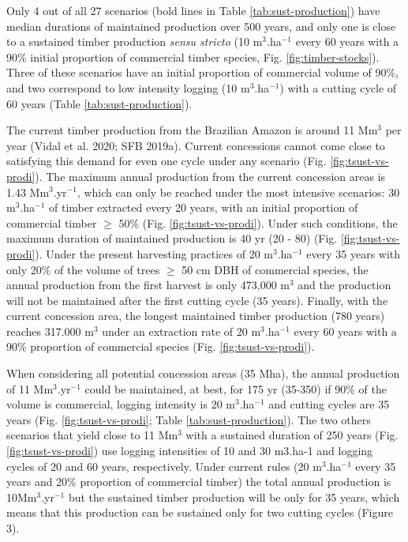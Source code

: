 \documentclass[
]{article}
\begin{document}
Only 4 out of all 27 scenarios (bold lines in Table \ref{tab:sust-production}) have median durations of maintained production over 500 years, and only one is close to a sustained timber production \emph{sensu stricto} (10 m\(^3\).ha\(^{-1}\) every 60 years with a 90\% initial proportion of commercial timber species, Fig. \ref{fig:timber-stocks}). Three of these scenarios have an initial proportion of commercial volume of 90\%, and two correspond to low intensity logging (10 m\(^3\).ha\(^{-1}\)) with a cutting cycle of 60 years (Table \ref{tab:sust-production}).

The current timber production from the Brazilian Amazon is around 11 Mm\(^3\) per year (Vidal et al. 2020; SFB 2019a). Current concessions cannot come close to satisfying this demand for even one cycle under any scenario (Fig. \ref{fig:tsust-vs-prodi}). The maximum annual production from the current concession areas is 1.43 Mm\(^3\).yr\(^{-1}\), which can only be reached under the most intensive scenarios: 30 m\(^3\).ha\(^{-1}\) of timber extracted every 20 years, with an initial proportion of commercial timber \(\geq\) 50\% (Fig. \ref{fig:tsust-vs-prodi}). Under such conditions, the maximum duration of maintained production is 40 yr (20 - 80) (Fig. \ref{fig:tsust-vs-prodi}). Under the present harvesting practices of 20 m\(^3\).ha\(^{-1}\) every 35 years with only 20\% of the volume of trees \(\geq\) 50 cm DBH of commercial species, the annual production from the first harvest is only 473,000 m\(^3\) and the production will not be maintained after the first cutting cycle (35 years). Finally, with the current concession area, the longest maintained timber production (780 years) reaches 317.000 m\(^3\) under an extraction rate of 20 m\(^3\).ha\(^{-1}\) every 60 years with a 90\% proportion of commercial species (Fig. \ref{fig:tsust-vs-prodi}).

When considering all potential concession areas (35 Mha), the annual production of 11 Mm\(^3\).yr\(^{-1}\) could be maintained, at best, for 175 yr (35-350) if 90\% of the volume is commercial, logging intensity is 20 m\(^3\).ha\(^{-1}\) and cutting cycles are 35 years (Fig. \ref{fig:tsust-vs-prodi}; Table \ref{tab:sust-production}). The two others scenarios that yield close to 11 Mm\(^3\) with a sustained duration of 250 years (Fig. \ref{fig:tsust-vs-prodi}) use logging intensities of 10 and 30 m3.ha-1 and logging cycles of 20 and 60 years, respectively. Under current rules (20 m\(^3\).ha\(^{-1}\) every 35 years and 20\% proportion of commercial timber) the total annual production is 10Mm\(^3\).yr\(^{-1}\) but the sustained timber production will be only for 35 years, which means that this production can be sustained only for two cutting cycles (Figure 3).
\end{document}
